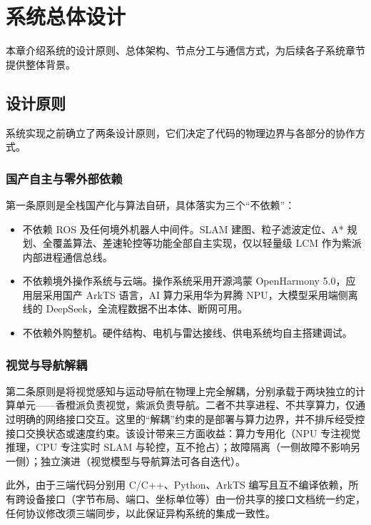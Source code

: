\chapter{系统总体设计}
\label{ch:architecture}

本章介绍系统的设计原则、总体架构、节点分工与通信方式，为后续各子系统章节提供整体背景。

\section{设计原则}
\label{sec:design-principles}

系统实现之前确立了两条设计原则，它们决定了代码的物理边界与各部分的协作方式。

\subsection{国产自主与零外部依赖}
\label{sec:domestic-independent}

第一条原则是全栈国产化与算法自研，具体落实为三个“不依赖”：

\begin{itemize}
\item 不依赖 ROS 及任何境外机器人中间件。SLAM 建图、粒子滤波定位、A* 规划、全覆盖算法、差速轮控等功能全部自主实现，仅以轻量级 LCM 作为紫派内部进程通信总线。
\item 不依赖境外操作系统与云端。操作系统采用开源鸿蒙 OpenHarmony 5.0，应用层采用国产 ArkTS 语言，AI 算力采用华为昇腾 NPU，大模型采用端侧离线的 DeepSeek，全流程数据不出本体、断网可用。
\item 不依赖外购整机。硬件结构、电机与雷达接线、供电系统均自主搭建调试。
\end{itemize}

\subsection{视觉与导航解耦}
\label{sec:vision-nav-decoupling}

第二条原则是将视觉感知与运动导航在物理上完全解耦，分别承载于两块独立的计算单元——香橙派负责视觉，紫派负责导航。二者不共享进程、不共享算力，仅通过明确的网络接口交互。这里的“解耦”约束的是部署与算力边界，并不排斥经受控接口交换状态或速度约束。该设计带来三方面收益：算力专用化（NPU 专注视觉推理，CPU 专注实时 SLAM 与轮控，互不抢占）；故障隔离（一侧故障不影响另一侧）；独立演进（视觉模型与导航算法可各自迭代）。

此外，由于三端代码分别用 C/C++、Python、ArkTS 编写且互不编译依赖，所有跨设备接口（字节布局、端口、坐标单位等）由一份共享的接口文档统一约定，任何协议修改须三端同步，以此保证异构系统的集成一致性。

